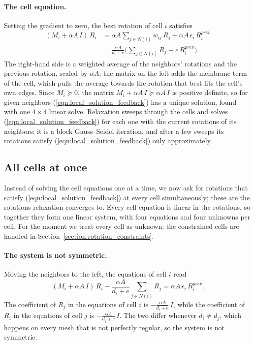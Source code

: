 \documentclass{birkjour}
\theoremstyle{remark}
\numberwithin{equation}{section}
\begin{document}
\paragraph{The cell equation.} Setting the gradient to zero, the best rotation of cell $i$ satisfies
\begin{equation}
\label{eqn:local_solution_feedback}
\begin{aligned}
(M_i + \alpha A \, I) \, R_i &= \alpha A \sum_{j \in N(i)} w_{ij} \, R_j + \alpha A \, \epsilon_i \, R^{prev}_i \\
&= \frac{\alpha A}{d_i + e} \Big( \sum_{j \in N(i)} R_j + e \, R^{prev}_i \Big).
\end{aligned}
\end{equation}
The right-hand side is a weighted average of the neighbors' rotations and the previous rotation, scaled by $\alpha A$; the matrix on the left adds the membrane term of the cell, which pulls the average towards the rotation that best fits the cell's own edges. Since $M_i \succeq 0$, the matrix $M_i + \alpha A \, I \succeq \alpha A \, I$ is positive definite, so for given neighbors (\ref{eqn:local_solution_feedback}) has a unique solution, found with one $4 \times 4$ linear solve. Relaxation sweeps through the cells and solves (\ref{eqn:local_solution_feedback}) for each one with the current rotations of its neighbors: it is a block Gauss--Seidel iteration, and after a few sweeps its rotations satisfy (\ref{eqn:local_solution_feedback}) only approximately.

\subsection{All cells at once}
\label{section:all_cells}

Instead of solving the cell equations one at a time, we now ask for rotations that satisfy (\ref{eqn:local_solution_feedback}) at every cell simultaneously; these are the rotations relaxation converges to. Every cell equation is linear in the rotations, so together they form one linear system, with four equations and four unknowns per cell. For the moment we treat every cell as unknown; the constrained cells are handled in Section~\ref{section:rotation_constraints}.

\paragraph{The system is not symmetric.} Moving the neighbors to the left, the equations of cell $i$ read
\begin{equation*}
(M_i + \alpha A \, I) \, R_i - \frac{\alpha A}{d_i + e} \sum_{j \in N(i)} R_j = \alpha A \, \epsilon_i \, R^{prev}_i .
\end{equation*}
The coefficient of $R_j$ in the equations of cell $i$ is $-\frac{\alpha A}{d_i + e} \, I$, while the coefficient of $R_i$ in the equations of cell $j$ is $-\frac{\alpha A}{d_j + e} \, I$. The two differ whenever $d_i \neq d_j$, which happens on every mesh that is not perfectly regular, so the system is not symmetric.
\end{document}
